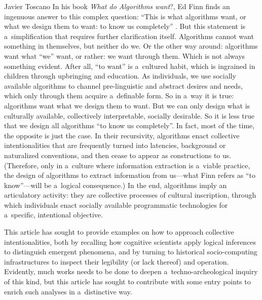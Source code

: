 \begin{artengenv}{Javier Toscano}
In his book \textit{What do Algorithms want}?, Ed Finn finds an ingenuous answer to this complex question: ``This is what algorithms want, or what we design them to want: to know us completely''
\parencite[][p.82]{finn_what_2017}. %
 But this statement is a~simplification that requires further clarification itself. Algorithms cannot want something in themselves, but neither do we. Or the other way around: algorithms want what ``we'' want, or rather: we want through them. Which is not always something evident. After all, ``to want'' is a~cultured habit, which is ingrained in children through upbringing and education. As individuals, we use socially available algorithms to channel pre-linguistic and abstract desires and needs, which only through them acquire a~definable form. So in a~way it is true: algorithms want what we design them to want. But we can only design what is culturally available, collectively interpretable, socially desirable. So it is less true that we design all algorithms ``to know us completely''. In fact, most of the time, the opposite is just the case. In their recursivity, algorithms enact collective intentionalities that are frequently turned into latencies, background or naturalized conventions, and then cease to appear as constructions to us. (Therefore, only in a~culture where information extraction is a~viable practice, the design of algorithms to extract information from us---what Finn refers as ``to know''---will be a~logical consequence.) In the end, algorithms imply an articulatory activity: they are collective processes of cultural inscription, through which individuals enact socially available programmatic technologies for a~specific, intentional objective.

This article has sought to provide examples on how to approach collective intentionalities, both by recalling how cognitive scientists apply logical inferences to distinguish emergent phenomena, and by turning to historical socio-computing infrastructures to inspect their legibility (or lack thereof) and operation. Evidently, much works needs to be done to deepen a~techno-archeological inquiry of this kind, but this article has sought to contribute with some entry points to enrich such analyses in a~distinctive way.



\end{artengenv}





